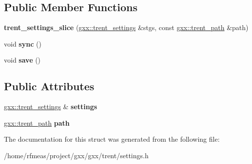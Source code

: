 \subsection*{Public Member Functions}
\begin{DoxyCompactItemize}
\item 
{\bfseries trent\+\_\+settings\+\_\+slice} (\hyperlink{structgxx_1_1trent__settings}{gxx\+::trent\+\_\+settings} \&stgs, const \hyperlink{structgxx_1_1trent__path}{gxx\+::trent\+\_\+path} \&path)\hypertarget{structgxx_1_1trent__settings__slice_a08b40ff5e4a98b8471fc326a38831ede}{}\label{structgxx_1_1trent__settings__slice_a08b40ff5e4a98b8471fc326a38831ede}

\item 
void {\bfseries sync} ()\hypertarget{structgxx_1_1trent__settings__slice_a4410f4c32edadb33a037bbb2717d1fdd}{}\label{structgxx_1_1trent__settings__slice_a4410f4c32edadb33a037bbb2717d1fdd}

\item 
void {\bfseries save} ()\hypertarget{structgxx_1_1trent__settings__slice_a24e3384007140ed96086b6316005ca01}{}\label{structgxx_1_1trent__settings__slice_a24e3384007140ed96086b6316005ca01}

\end{DoxyCompactItemize}
\subsection*{Public Attributes}
\begin{DoxyCompactItemize}
\item 
\hyperlink{structgxx_1_1trent__settings}{gxx\+::trent\+\_\+settings} \& {\bfseries settings}\hypertarget{structgxx_1_1trent__settings__slice_a596dfeac2a2cdbb2290d2a3cdb3a877c}{}\label{structgxx_1_1trent__settings__slice_a596dfeac2a2cdbb2290d2a3cdb3a877c}

\item 
\hyperlink{structgxx_1_1trent__path}{gxx\+::trent\+\_\+path} {\bfseries path}\hypertarget{structgxx_1_1trent__settings__slice_ad2cbf428830d320b8672c2226292d612}{}\label{structgxx_1_1trent__settings__slice_ad2cbf428830d320b8672c2226292d612}

\end{DoxyCompactItemize}


The documentation for this struct was generated from the following file\+:\begin{DoxyCompactItemize}
\item 
/home/rfmeas/project/gxx/gxx/trent/settings.\+h\end{DoxyCompactItemize}
